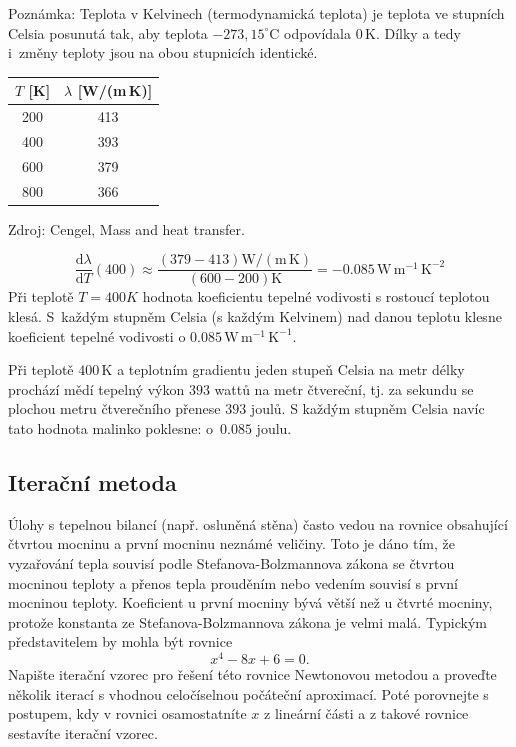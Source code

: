 {\footnotesize Poznámka: Teplota v Kelvinech (termodynamická teplota) je teplota ve stupních Celsia posunutá tak, aby teplota $-273{,}15^\circ\mathrm C$ odpovídala $0\,\mathrm K$. Dílky a tedy i~změny teploty jsou na obou stupnicích identické.

  }

{\centering 
\begin{tabular}{cc}
  $T$ [K] & $\lambda$ [W/(m\,K)]\\
  \hline
  200 & 413 \\
  400 & 393 \\
  600 & 379 \\
  800 & 366 \\
\end{tabular}

{\footnotesize Zdroj: Cengel, Mass and heat transfer.}

}
\reseni

$$\frac{\mathrm d\lambda}{\mathrm dT}(400) \approx \frac{(379 -413) \mathrm {W}/(\mathrm m\,\mathrm K)}{(600-200)\mathrm K}=-0.085\,\mathrm W \,\mathrm m^{-1}\,\mathrm K^{-2}$$
Při teplotě $T=400 K$ hodnota koeficientu tepelné vodivosti s rostoucí teplotou klesá. S~každým stupněm Celsia (s každým Kelvinem) nad danou teplotu klesne koeficient tepelné vodivosti o $0.085\,\mathrm W \,\mathrm m^{-1}\,\mathrm K^{-1}$.

Při teplotě $400\,\mathrm K$ a teplotním gradientu jeden stupeň Celsia na metr délky prochází mědí tepelný výkon $393$ wattů na metr čtvereční, tj. za sekundu se plochou metru čtverečního přenese $393$ joulů. S každým stupněm Celsia navíc tato hodnota malinko poklesne: o~$0.085$ joulu.
\konec


\stranka

\subsection{Iterační metoda}


Úlohy s tepelnou bilancí (např. osluněná stěna) často vedou na rovnice obsahující čtvrtou mocninu  a první mocninu neznámé veličiny. Toto je dáno tím, že vyzařování tepla souvisí podle Stefanova-Bolzmannova zákona se čtvrtou mocninou teploty  a přenos tepla prouděním nebo vedením souvisí s první mocninou teploty.
Koeficient u první mocniny bývá větší než u čtvrté mocniny, protože konstanta ze Stefanova-Bolzmannova zákona je velmi malá. Typickým představitelem by mohla být rovnice $$x^4-8x+6=0.$$
Napište iterační vzorec pro řešení této rovnice Newtonovou metodou a proveďte několik iterací s vhodnou celočíselnou počáteční aproximací. Poté porovnejte s postupem, kdy v rovnici osamostatníte $x$ z lineární části a z takové rovnice sestavíte iterační vzorec.


